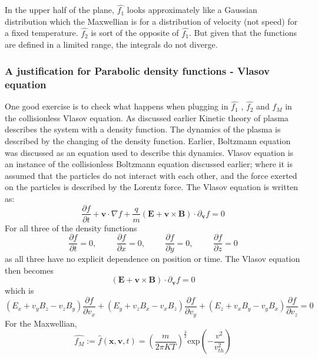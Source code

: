 \documentclass[12pt]{article}
\begin{document}
	\noindent In the upper half of the plane, $\hat{f_{1}}$ looks approximately like a Gaussian distribution which the Maxwellian is for a distribution of velocity (not speed) for a fixed temperature. $\hat{f_{2}}$ is sort of the opposite of $\hat{f_{1}}$. But given that the functions are defined in a limited range, the integrals do not diverge.
	
	\subsubsection{A justification for Parabolic density functions - Vlasov equation}
	One good exercise is to check what happens when plugging in  $\hat{f_{1}}$ , $\hat{f_{2}}$ and $f_{M}$ in  the collisionless Vlasov equation. As discussed earlier Kinetic theory of plasma describes the system with a density function. The dynamics of the plasma is described by the changing of the density function. Earlier, Boltzmann equation was discussed as an equation used to describe this dynamics. Vlasov equation is an instance of the collisionless Boltzmann equation discussed earlier; where it is assumed that the particles do not interact with each other, and the force exerted on the particles is described by the Lorentz force. The Vlasov equation is written as:
	$$ \frac{\partial f}{\partial t} + \boldsymbol{v} \cdot \nabla f + \frac{q}{m} \left(\mathrm{\mathbf{E}}+\boldsymbol{v} \times \mathrm{\mathbf{B}} \right) \cdot {\partial}_{\boldsymbol{v}} f = 0 $$
	For all three of the density functions
	$$\frac{\displaystyle \partial f}{\displaystyle \partial t} = 0 \mathrm{,} \hspace{1cm} \frac{\displaystyle \partial f}{\displaystyle \partial x} = 0 \mathrm{,} \hspace{1cm} \frac{\displaystyle \partial f}{\displaystyle \partial y} = 0 \mathrm{,} \hspace{1cm} \frac{\displaystyle \partial f}{\displaystyle \partial z} = 0 $$ as all three have no explicit dependence on position or time. The Vlasov equation then becomes $$ \left(\mathrm{\mathbf{E}}+\boldsymbol{v} \times \mathrm{\mathbf{B}} \right) \cdot {\partial}_{\boldsymbol{v}} f = 0 $$ which is 
	$$ \left(E_{x} + v_{y} B_{z} - v_{z} B_{y}\right) \frac{\displaystyle \partial f}{\displaystyle \partial v_{x}} + \left(E_{y} + v_{z} B_{x} - v_{x} B_{z}\right) \frac{\displaystyle \partial f}{\displaystyle \partial v_{y}} + \left(E_{z} + v_{x} B_{y} - v_{y} B_{x}\right) \frac{\displaystyle \partial f}{\displaystyle \partial v_{z}} = 0$$
	For the Maxwellian, $$ 	\widehat{f_{M}} := \hat{f}(\boldsymbol{x}, \boldsymbol{v}, t) = \left(\frac{m}{2\pi KT}\right)^{\frac{3}{2}} \mathrm{exp}\left(-\frac{v^{2}}{v_{th}^{2}}\right) $$
\end{document}

